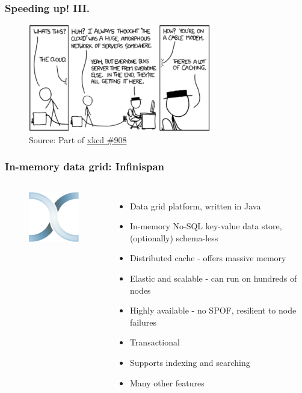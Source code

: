 \documentclass[10pt,utf8]{beamer}
\begin{document}
\begin{frame}
	\frametitle{Speeding up! III.}
	
	\vspace{0.5cm}
	\vspace{0.5cm}
	
	\begin{figure}
		\centering
		\includegraphics[width=8cm]{./img/xkcd_908.eps}
		\caption{\tiny{Source: Part of \href{http://xkcd.com/908/}{xkcd \#908}}}
	\end{figure}
\end{frame}

\begin{frame}
	\frametitle{In-memory data grid: Infinispan}
	\begin{columns}
		\begin{figure}
			\centering
			\includegraphics[width=3cm]{./img/infinispan.eps}
		\end{figure}
		\begin{itemize}
			\item Data grid platform, written in Java
			\item In-memory No-SQL key-value data store, (optionally) schema-less
			\item Distributed cache - offers massive memory
			\item Elastic and scalable - can run on hundreds of nodes
			\item Highly available - no SPOF, resilient to node failures
			\item Transactional
			\item Supports indexing and searching
			\item Many other features
		\end{itemize}
	\end{columns}
\end{frame}
\end{document}
